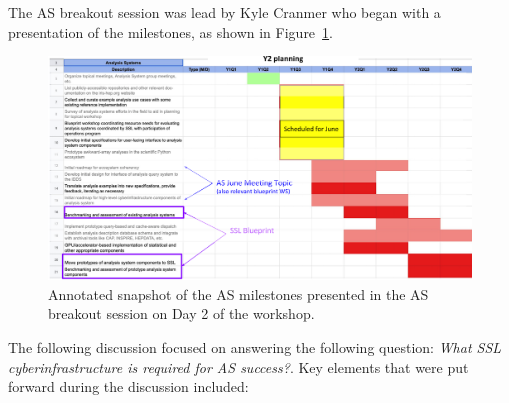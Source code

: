\documentclass[11pt,letterpaper,fleqn]{article}
\begin{document}
The AS breakout session was lead by Kyle Cranmer who began with a presentation of the milestones, as shown in Figure~\ref{fig:AS_milestones}.
\begin{figure}
  \includegraphics[width=\linewidth]{figures/as_milestones.png}
  \caption{Annotated snapshot of the AS milestones presented in the AS breakout session on Day 2 of the workshop.}
  \label{fig:AS_milestones}
\end{figure}
The following discussion focused on answering the following question: {\it What SSL cyberinfrastructure is required for AS success?}. Key elements that were put forward during the discussion included:
\end{document}
